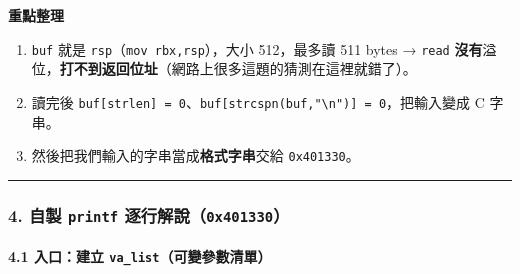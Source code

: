 \documentclass[10pt,a4paper]{article}
\providecommand{\tightlist}{%
  \setlength{\itemsep}{0pt}\setlength{\parskip}{0pt}}
\begin{document}
\textbf{重點整理}

\begin{enumerate}
\def\labelenumi{\arabic{enumi}.}
\tightlist
\item
  \texttt{buf} 就是 \texttt{rsp}（\texttt{mov\ \allowbreak{}rbx,\allowbreak{}rsp}），大小
  512，最多讀 511 bytes → \texttt{read}
  \textbf{沒有}溢位，\textbf{打不到返回位址}（網路上很多這題的猜測在這裡就錯了）。
\item
  讀完後
  \texttt{buf{[}strlen{]}\ \allowbreak{}=\ \allowbreak{}0}、\texttt{buf{[}strcspn(buf,"\textbackslash{}\allowbreak{}n"){]}\ \allowbreak{}=\ \allowbreak{}0}，把輸入變成
  C 字串。
\item
  然後把我們輸入的字串當成\textbf{格式字串}交給 \texttt{0x401330}。
\end{enumerate}

\begin{center}\rule{0.5\linewidth}{0.5pt}\end{center}

\subsubsection{\texorpdfstring{4. 自製 \texttt{printf}
逐行解說（\texttt{0x401330}）}{4. 自製 printf 逐行解說（0x401330）}}\label{ux81eaux88fd-printf-ux9010ux884cux89e3ux8aaa0x401330}

\paragraph{\texorpdfstring{4.1 入口：建立
\texttt{va\_\allowbreak{}list}（可變參數清單）}{4.1 入口：建立 va\_list（可變參數清單）}}\label{ux5165ux53e3ux5efaux7acb-va_listux53efux8b8aux53c3ux6578ux6e05ux55ae}
\end{document}
